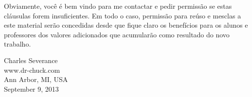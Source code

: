 
Obviamente, você é bem vindo para me contactar e pedir permissão se estas
cláusulas forem insuficientes. Em todo o caso, permissão para reúso e 
mesclas a este material serão concedidas desde que fique claro os
benefícios para os alunos e professores dos valores adicionados que acumularão
como resultado do novo trabalho.

Charles Severance\\
www.dr-chuck.com\\
Ann Arbor, MI, USA\\
September 9, 2013



\normalsize

\printindex

\clearemptydoublepage



